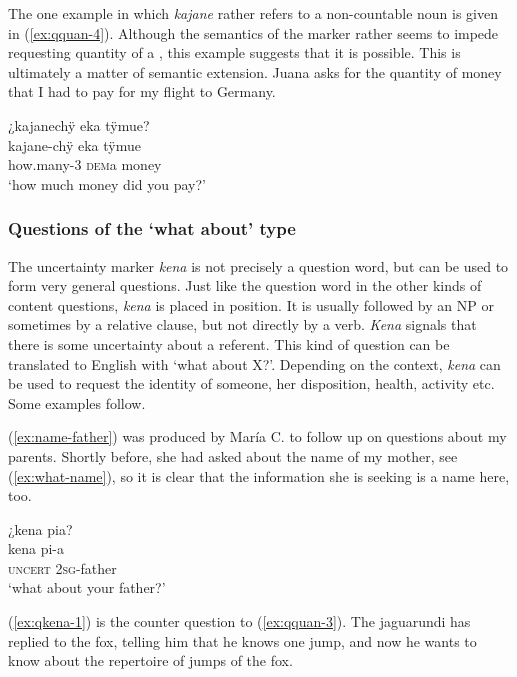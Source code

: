 The one example in which \textit{kajane} rather refers to a non-countable noun is given in (\ref{ex:qquan-4}).  Although the semantics of the  marker rather seems to impede requesting quantity of a , this example suggests that it is possible. This is ultimately a matter of semantic extension.
Juana asks for the quantity of money that I had to pay for my flight to Germany.

\ea\label{ex:qquan-4}
\begingl
\glpreamble ¿kajanechÿ eka tÿmue?\\
\gla kajane-chÿ eka tÿmue\\
\glb how.many-3 \textsc{dem}a money\\
\glft ‘how much money did you pay?’
\endgl
\trailingcitation{[jxx-p120430l-1.157]}
\xe

\subsubsection{Questions of the ‘what about’ type}\label{sec:Q_kena}

The uncertainty marker \textit{kena} is not precisely a question word, but can be used to form very general questions. Just like the question word in the other kinds of content questions, \textit{kena} is placed in  position. It is usually followed by an NP or sometimes by a relative clause, but not directly by a verb. \textit{Kena} signals that there is some uncertainty about a referent. This kind of question can be translated to English with ‘what about X?’. Depending on the context, \textit{kena} can be used to request the identity of someone, her disposition, health, activity etc. Some examples follow.

(\ref{ex:name-father}) was produced by María C. to follow up on questions about my parents. Shortly before, she had asked about the name of my mother, see (\ref{ex:what-name}), so it is clear that the information she is seeking is a name here, too.

\ea\label{ex:name-father}
\begingl
\glpreamble ¿kena pia?\\
\gla kena pi-a\\
\glb \textsc{uncert} 2\textsc{sg}-father\\
\glft ‘what about your father?’
\endgl
\trailingcitation{[uxx-p110825l.152]}
\xe

(\ref{ex:qkena-1}) is the counter question to (\ref{ex:qquan-3}). The jaguarundi has replied to the fox, telling him that he knows one jump, and now he wants to know about the repertoire of jumps of the fox.

